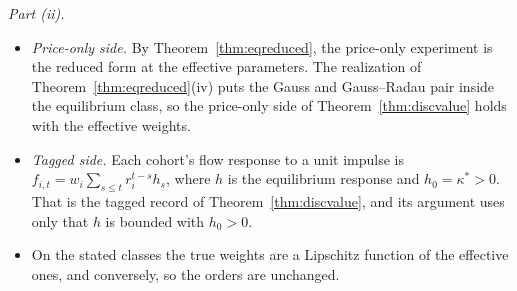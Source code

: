 \emph{Part (ii).}
\begin{itemize}[itemsep=1pt,topsep=2pt]
\item \emph{Price-only side.} By Theorem~\ref{thm:eqreduced}, the price-only experiment is the reduced form at the effective parameters. The realization of Theorem~\ref{thm:eqreduced}(iv) puts the Gauss and Gauss--Radau pair inside the equilibrium class, so the price-only side of Theorem~\ref{thm:discvalue} holds with the effective weights.
\item \emph{Tagged side.} Each cohort's flow response to a unit impulse is $f_{i,t}=w_i\sum_{s\le t}r_i^{t-s}h_s$, where $h$ is the equilibrium response and $h_0=\kappa^*>0$. That is the tagged record of Theorem~\ref{thm:discvalue}, and its argument uses only that $h$ is bounded with $h_0>0$.
\item On the stated classes the true weights are a Lipschitz function of the effective ones, and conversely, so the orders are unchanged.
\end{itemize}


